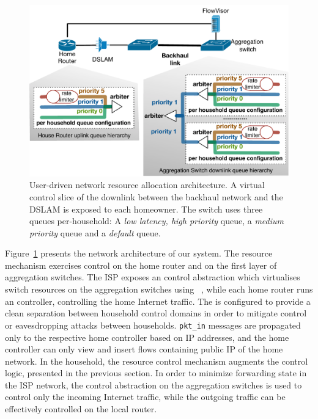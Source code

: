 \begin{figure}
  \centering
  \includegraphics[width=0.7\columnwidth]{queue_design}
  \caption[User-driven QoS architecture]{User-driven network resource allocation architecture. 
    \label{fig:queue_design} A virtual control slice of the downlink between the backhaul
    network and the DSLAM is exposed to each homeowner.  The switch
    uses three queues per-household: A {\it low latency,
      high priority} \/queue, a {\it medium priority} \/queue and a {\it default}
    \/queue.}
\end{figure}

Figure~\ref{fig:queue_design} presents the network architecture of our system.
The resource mechanism exercises control on the home router and on the first layer
of aggregation switches.  The ISP exposes an \of control abstraction which
virtualises switch resources on the aggregation switches using
\flv~, while each home router runs an \of
controller, controlling the home Internet traffic.  The \flv is configured
to provide a clean separation between household control domains in order to
mitigate control or eavesdropping attacks between households. \texttt{pkt\_in}
messages are propagated only to the respective home controller based on IP
addresses, and the home controller can only view and insert flows containing
public IP of the home network\@.   In the household, the resource control mechanism
augments the control logic, presented in the previous section. In order to
minimize forwarding state in the ISP network, the control abstraction on the
aggregation switches is used to control only the incoming Internet traffic,
while the outgoing traffic can be effectively controlled on the local router. 

